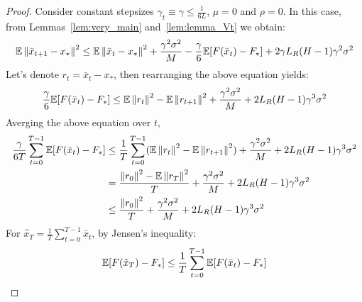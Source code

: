 \begin{proof}
    Consider constant stepsizes $\gamma_t \equiv \gamma \leq \frac{1}{6L}$, $\mu = 0$ and $\rho = 0$.
    In this case, from Lemmas~\ref{lem:very_main} and~\ref{lem:lemma_Vt} we obtain:
    \begin{align}
        \begin{split}
            \mathbb{E} \left\|\bar{x}_{t+1}-x_*\right\|^2
            \leq
            \mathbb{E} \left\|\bar{x}_t - x_*\right\|^2 
            + \frac{\gamma^2 \sigma^2}{M}
            - \frac{\gamma}{6} \mathbb{E} [F(\bar{x}_t) - F_*] 
            + 2 \gamma L_R (H-1) \gamma^2 \sigma^2
        \end{split}
    \end{align}
    Let's denote $r_t = \bar{x}_t - x_*$, then rearranging the above equation yields:
    \begin{align}
        \begin{split}
            \frac{\gamma}{6} \mathbb{E} [F(\bar{x}_t) - F_*]
            \leq
            \mathbb{E} \left\|r_t\right\|^2 
            - \mathbb{E} \left\|r_{t+1}\right\|^2
            + \frac{\gamma^2 \sigma^2}{M}
            + 2 L_R (H-1) \gamma^3 \sigma^2
        \end{split}
    \end{align}
    Averging the above equation over $t$,
    \begin{align}
        \begin{split}
            \frac{\gamma}{6 T} \sum_{t=0}^{T-1} \mathbb{E} [F(\bar{x}_t) - F_*]
            &\leq 
            \frac{1}{T} \sum_{t=0}^{T-1} 
            (\mathbb{E} \left\|r_t\right\|^2 
            - \mathbb{E} \left\|r_{t+1}\right\|^2)
            + \frac{\gamma^2 \sigma^2}{M}
            + 2 L_R (H-1) \gamma^3 \sigma^2 \\
            &= \frac{\left\|r_0\right\|^2 - \mathbb{E}\left\|r_T\right\|^2}{T}
            + \frac{\gamma^2 \sigma^2}{M}
            + 2 L_R (H-1) \gamma^3 \sigma^2  \\
            &\leq
            \frac{\left\|r_0\right\|^2}{T}
            + \frac{\gamma^2 \sigma^2}{M}
            + 2 L_R (H-1) \gamma^3 \sigma^2 \label{eq:avergingovert}
        \end{split}
    \end{align}
    For $\hat{x}_T = \frac{1}{T} \sum_{t=0}^{T-1} \bar{x}_t$, by Jensen's inequality:
    \begin{align}
        \begin{split}
            \mathbb{E} [F(\hat{x}_T) - F_*] \leq \frac{1}{T} \sum_{t=0}^{T-1} \mathbb{E} [F(\bar{x}_t) - F_*] \label{eq:jens}
        \end{split}
    \end{align}

\end{proof}
